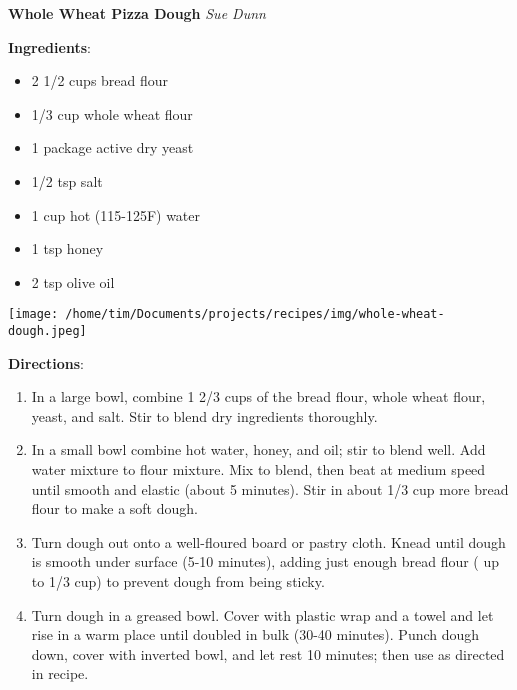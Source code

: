 \documentclass[11pt, twoside, openany]{book}
\begin{document}
\noindent\begin{minipage}[t]{\linewidth}%
{\Large\textbf{Whole Wheat Pizza Dough}} \label{whole-wheat-pizza-dough}\hfill\textit{Sue Dunn}\\
\noindent\begin{minipage}[t]{0.78\linewidth}%
\textbf{Ingredients}:\vspace{-3mm}
\begin{multicols}{2}
\begin{itemize}\setlength\itemsep{-1mm}
\item 2 1/2 cups bread flour
\item 1/3 cup whole wheat flour
\item 1 package active dry yeast
\item 1/2 tsp salt
\item 1 cup hot (115-125F) water
\item 1 tsp honey
\item 2 tsp olive oil
\end{itemize}
\end{multicols}
\end{minipage}
\noindent\begin{minipage}[t]{0.18\linewidth}
\centering \strut\vspace*{-\baselineskip}\newline
\texttt{[image: /home/tim/Documents/projects/recipes/img/whole-wheat-dough.jpeg]}\\
\end{minipage}\vspace{3mm}
\textbf{Directions}:
\vspace{-3mm}\begin{enumerate}\setlength\itemsep{-1mm}
\item In a large bowl, combine 1 2/3 cups of the bread flour, whole wheat flour, yeast, and salt. Stir to blend dry ingredients thoroughly.
\item In a small bowl combine hot water, honey, and oil; stir to blend well. Add water mixture to flour mixture. Mix to blend, then beat at medium speed until smooth and elastic (about 5 minutes). Stir in about 1/3 cup more bread flour to make a soft dough.
\item Turn dough out onto a well-floured board or pastry cloth. Knead until dough is smooth under surface (5-10 minutes), adding just enough bread flour ( up to 1/3 cup) to prevent dough from being sticky.
\item Turn dough in a greased bowl. Cover with plastic wrap and a towel and let rise in a warm place until doubled in bulk (30-40 minutes). Punch dough down, cover with inverted bowl, and let rest 10 minutes; then use as directed in recipe.
\end{enumerate}
\end{minipage}\vspace{8mm}
\end{document}
